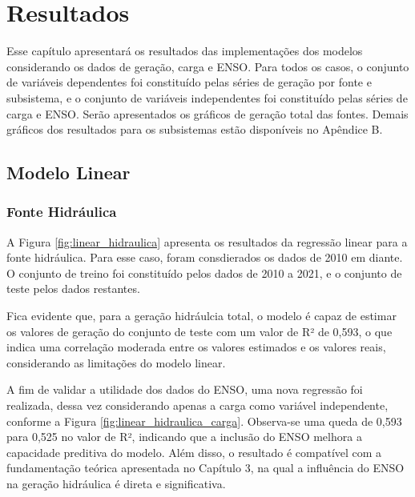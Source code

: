 \chapter{Resultados}
Esse capítulo apresentará os resultados das implementações dos modelos considerando os dados de geração, carga e ENSO.
Para todos os casos, o conjunto de variáveis dependentes foi constituído pelas séries de geração por fonte e subsistema,
e o conjunto de variáveis independentes foi constituído pelas séries de carga e ENSO. Serão apresentados os gráficos
de geração total das fontes. Demais gráficos dos resultados para os subsistemas estão disponíveis no Apêndice B.

\section{Modelo Linear}
\subsection{Fonte Hidráulica}
A Figura \ref{fig:linear_hidraulica} apresenta os resultados da regressão linear para a fonte hidráulica. Para esse caso,
foram consdierados os dados de 2010 em diante. O conjunto de treino foi constituído pelos dados de 2010 a 2021, e o 
conjunto de teste pelos dados restantes. 

\begin{figure}[!ht]
  {}
  {}
\end{figure}
Fica evidente que, para a geração hidráulcia total, o modelo é capaz de estimar os valores de geração do conjunto de teste
com um valor de R² de 0,593, o que indica uma correlação moderada entre os valores estimados e os valores reais, considerando
as limitações do modelo linear. 

A fim de validar a utilidade dos dados do ENSO, uma nova regressão foi realizada, dessa vez
considerando apenas a carga como variável independente, conforme a Figura \ref{fig:linear_hidraulica_carga}. Observa-se 
uma queda de 0,593 para 0,525 no valor de R², indicando que a inclusão do ENSO melhora a capacidade preditiva do modelo.
Além disso, o resultado é compatível com a fundamentação teórica apresentada no Capítulo 3, na qual a influência do ENSO
na geração hidráulica é direta e significativa.

\begin{figure}[!ht]
  {}
  {}
\end{figure}

